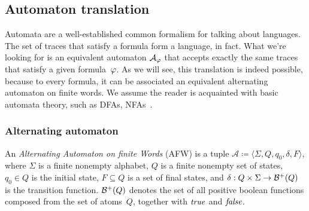\subsection{Automaton translation}

\label{sec:ldlf-to-automa}

Automata are a well-established common formalism for talking about languages.
The set of traces that satisfy a formula form a language, in fact.  What we're
looking for is an equivalent automaton $\mathcal{A}_\varphi$ that accepts
exactly the same traces that satisfy a given \ldl{} formula~$\varphi$.  As we
will see, this translation is indeed possible, because to every \ldl{}
formula, it can be associated an equivalent alternating automaton on finite
words.  We assume the reader is acquainted with basic automata theory, such as
DFAs, NFAs~\cite{bib:languages-book}.


\subsubsection{Alternating automaton}

\begin{definition}
	An \emph{Alternating Automaton on finite Words}
	(AFW) is a tuple
	$\mathcal{A} \coloneqq \langle \Sigma, Q, q_0, \delta, F \rangle$, where
	$\Sigma$ is a finite nonempty alphabet, $Q$ is a finite nonempty set of
	states, $q_0 \in Q$ is the initial state, $F \subseteq Q$ is a set of final
	states, and ${\delta: Q \times \Sigma \to \mathcal{B}^+(Q)}$ is the
	transition function.  $\mathcal{B}^+(Q)$ denotes the set of all positive
	boolean functions composed from the set of atoms~$Q$, together with $\text{\textit{true}}$
	and $\text{\textit{false}}$.
\end{definition}

